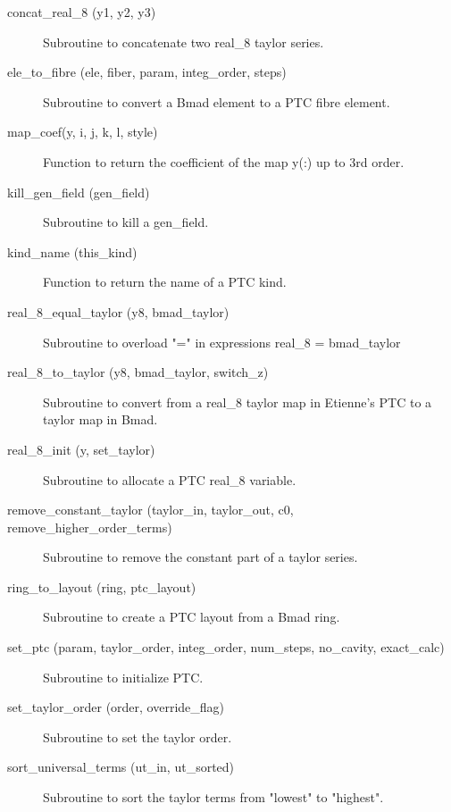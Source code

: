 \begin{description}

\item[concat\_real\_8 (y1, y2, y3)] \Newline
Subroutine to concatenate two real\_8 taylor series. 

\item[ele\_to\_fibre (ele, fiber, param, integ\_order, steps)] \Newline
Subroutine to convert a Bmad element to a PTC fibre element. 

\item[map\_coef(y, i, j, k, l, style)] \Newline
Function to return the coefficient of the map y(:) up to 3rd order. 

\item[kill\_gen\_field (gen\_field)] \Newline
Subroutine to kill a gen\_field. 

\item[kind\_name (this\_kind)] \Newline
Function to return the name of a PTC kind. 

\item[real\_8\_equal\_taylor (y8, bmad\_taylor)] \Newline
Subroutine to overload "=" in expressions real\_8 = bmad\_taylor 

\item[real\_8\_to\_taylor (y8, bmad\_taylor, switch\_z)] \Newline
Subroutine to convert from a real\_8 taylor map in Etienne's PTC to a taylor map in Bmad. 

\item[real\_8\_init (y, set\_taylor)] \Newline
Subroutine to allocate a PTC real\_8 variable. 

\item[remove\_constant\_taylor (taylor\_in, taylor\_out, c0, remove\_higher\_order\_terms)] \Newline
Subroutine to remove the constant part of a taylor series. 

\item[ring\_to\_layout (ring, ptc\_layout)] \Newline
Subroutine to create a PTC layout from a Bmad ring. 

\item[set\_ptc (param, taylor\_order, integ\_order, num\_steps, no\_cavity, exact\_calc)] \Newline
Subroutine to initialize PTC. 

\item[set\_taylor\_order (order, override\_flag)] \Newline
Subroutine to set the taylor order. 

\item[sort\_universal\_terms (ut\_in, ut\_sorted)] \Newline
Subroutine to sort the taylor terms from "lowest" to "highest". 


\end{description}
